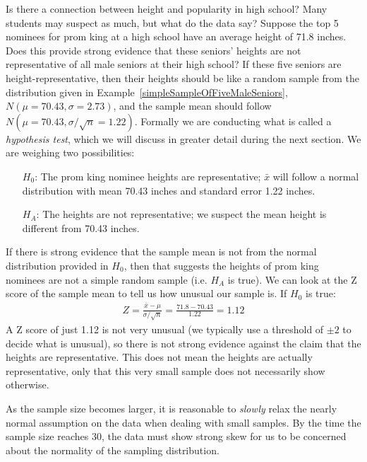 \begin{example}{Is there a connection between height and popularity in high school? Many students may suspect as much, but what do the data say? Suppose the top 5 nominees for prom king at a high school have an average height of 71.8 inches. Does this provide strong evidence that these seniors' heights are not representative of all male seniors at their high school?}
If these five seniors are height-representative, then their heights should be like a random sample from the distribution given in Example~\ref{simpleSampleOfFiveMaleSeniors}, $N\left(\mu=70.43, \sigma = 2.73\right)$, and the sample mean should follow $N\left(\mu=70.43, \sigma/\sqrt{n} = 1.22\right)$. Formally we are conducting what is called a \emph{hypothesis test}, which we will discuss in greater detail during the next section. We are weighing two possibilities:
\begin{itemize}
\setlength{\itemsep}{0mm}
\item[$H_0$:] The prom king nominee heights are representative; $\bar{x}$ will follow a normal distribution with mean 70.43 inches and standard error 1.22 inches.
\item[$H_A$:] The heights are not representative; we suspect the mean height is different from 70.43 inches.
\end{itemize}
If there is strong evidence that the sample mean is not from the normal distribution provided in $H_0$, then that suggests the heights of prom king nominees are not a simple random sample (i.e. $H_A$ is true). We can look at the Z score of the sample mean to tell us how unusual our sample is. If $H_0$ is true:
\begin{align*}
Z = \frac{\bar{x} - \mu}{\sigma/\sqrt{n}} = \frac{71.8 - 70.43}{1.22} = 1.12
\end{align*}
A Z score of just 1.12 is not very unusual (we typically use a threshold of $\pm2$ to decide what is unusual), so there is not strong evidence against the claim that the heights are representative. This does not mean the heights are actually representative, only that this very small sample does not necessarily show otherwise.
\end{example}

\begin{tipBox}{
As the sample size becomes larger, it is reasonable to \emph{slowly} relax the nearly normal assumption on the data when dealing with small samples. By the time the sample size reaches 30, the data must show strong skew for us to be concerned about the normality of the sampling distribution.}
\end{tipBox}


